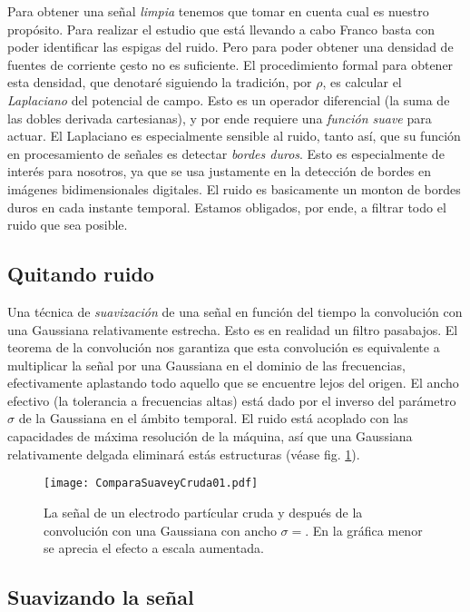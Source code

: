 \documentclass{article}
\begin{document}
Para obtener una señal \emph{limpia} tenemos que tomar en cuenta
cual es nuestro propósito. Para realizar el estudio que está llevando a cabo
Franco basta con poder identificar las espigas del ruido.
Pero para poder obtener una densidad de fuentes de corriente 
çesto no es suficiente.
El procedimiento formal para obtener esta densidad, que denotaré siguiendo
la tradición, por $\rho$, es calcular el \emph{Laplaciano} del potencial de
campo. Esto es un operador diferencial (la suma de las dobles derivada 
cartesianas), y por ende requiere una \emph{función suave} para actuar. 
El Laplaciano es especialmente sensible al ruido, tanto así, que su
función en procesamiento de señales es detectar \emph{bordes duros}.
Esto es especialmente de interés para nosotros, ya que se usa
justamente en la detección de bordes en imágenes bidimensionales digitales.
El ruido es basicamente un monton de bordes duros en cada instante temporal.
Estamos obligados, por ende, a filtrar todo el ruido que sea posible.

\subsection{Quitando ruido}

Una técnica de \emph{suavización} de una señal en función del tiempo
 la convolución con una Gaussiana relativamente estrecha. Esto es en realidad
un filtro pasabajos. El teorema de la convolución nos garantiza que esta
convolución es equivalente a multiplicar la señal por una Gaussiana 
en el dominio de las frecuencias, efectivamente aplastando todo aquello
que se encuentre lejos del origen. El ancho efectivo (la tolerancia a 
frecuencias altas) está dado por el inverso del parámetro $\sigma$ de
la Gaussiana en el ámbito temporal. El ruido está acoplado con 
las capacidades de máxima resolución de la máquina, así que una 
Gaussiana relativamente delgada eliminará estás estructuras (véase fig. 
\ref{Compara01}).

\begin{figure}[h]
\texttt{[image: ComparaSuaveyCruda01.pdf]}
\caption{La señal de un electrodo partícular cruda y después de
la convolución con una Gaussiana con ancho $\sigma=$. En la gráfica
menor se aprecia el efecto a escala aumentada.
}\label{Compara01}
\end{figure} 



\subsection{Suavizando la señal}
\end{document}
